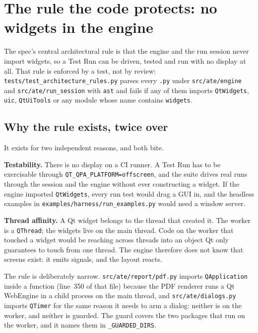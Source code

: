 \chapter{The rule the code protects: no widgets in the engine}\label{ch:rule}

The spec's central architectural rule is that the engine and the run session never import widgets, so
a Test Run can be driven, tested and run with no display at all. That rule is enforced by a test, not
by review: \texttt{tests/\allowbreak{}test\_\allowbreak{}architecture\_\allowbreak{}rules.py} parses every \texttt{.py} under
\texttt{src/ate/engine} and \texttt{src/ate/run\_session} with \texttt{ast} and fails if any of them
imports \texttt{QtWidgets}, \texttt{uic}, \texttt{QtUiTools} or any module whose name contains
\texttt{widgets}.

\section{Why the rule exists, twice over}

It exists for two independent reasons, and both bite.

\textbf{Testability.} There is no display on a CI runner. A Test Run has to be exercisable through
\texttt{QT\_\allowbreak{}QPA\_\allowbreak{}PLATFORM=offscreen}, and the suite drives real runs through the session and the engine
without ever constructing a widget. If the engine imported \texttt{QtWidgets}, every run test would
drag a GUI in, and the headless examples in \texttt{examples/\allowbreak{}harness/\allowbreak{}run\_\allowbreak{}examples.py} would need a
window server.

\textbf{Thread affinity.} A Qt widget belongs to the thread that created it. The worker is a
\texttt{QThread}; the widgets live on the main thread. Code on the worker that touched a widget would
be reaching across threads into an object Qt only guarantees to touch from one thread. The engine
therefore does not know that screens exist: it emits signals, and the layout reacts.

The rule is deliberately narrow. \texttt{src/\allowbreak{}ate/\allowbreak{}report/\allowbreak{}pdf.py} imports \texttt{QApplication} inside a
function (line~350 of that file) because the PDF renderer runs a Qt WebEngine in a child process on the
main thread, and \texttt{src/ate/dialogs.py} imports \texttt{QTimer} for the same reason it needs to
arm a dialog: neither is on the worker, and neither is guarded. The guard covers the two packages that
run on the worker, and it names them in \texttt{\_GUARDED\_DIRS}.

